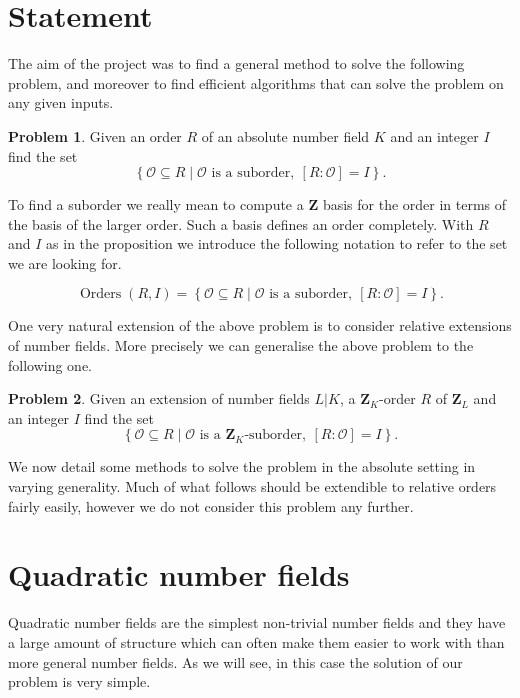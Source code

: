 \documentclass[12pt,a4paper,abstracton,bibtotoc]{scrreprt}
\theoremstyle{definition}
\newtheorem{prob}{Problem}
\newcommand{\ZZ}{\mathbf{Z}}
\renewcommand{\O}{\mathcal{O}}
\DeclareMathOperator{\Orders}{Orders}
\begin{document}
\section{Statement}
\label{sec:statements}

The aim of the project was to find a general method to solve the following problem, and moreover to find efficient algorithms that can solve the problem on any given inputs.

\begin{prob}
Given an order $R$ of an absolute number field $K$ and an integer $I$ find the set
\[\left\{ \O\subseteq R \mid \O\text{ is a suborder},\ [R:\O] = I\right\}.\]
\end{prob}

To find a suborder we really mean to compute a $\ZZ$ basis for the order in terms of the basis of the larger order.
Such a basis defines an order completely.
With $R$ and $I$ as in the proposition we introduce the following notation to refer to the set we are looking for.

\[\Orders(R,I) = \left\{ \O\subseteq R \mid \O\text{ is a suborder},\ [R:\O] = I\right\}.\]

\minisec{}
One very natural extension of the above problem is to consider relative extensions of number fields.
More precisely we can generalise the above problem to the following one.

\begin{prob} %
Given an extension of number fields $L|K$, a $\ZZ_K$-order $R$ of $\ZZ_L$ and an integer $I$ find the set
\[\left\{ \O\subseteq R \mid \O\text{ is a $\ZZ_K$-suborder},\ [R:\O] = I\right\}.\]
\end{prob}

We now detail some methods to solve the problem in the absolute setting in varying generality.
Much of what follows should be extendible to relative orders fairly easily, however we do not consider this problem any further.

\section{Quadratic number fields}

Quadratic number fields are the simplest non-trivial number fields and they have a large amount of structure which can often make them easier to work with than more general number fields.
As we will see, in this case the solution of our problem is very simple.
\end{document}
